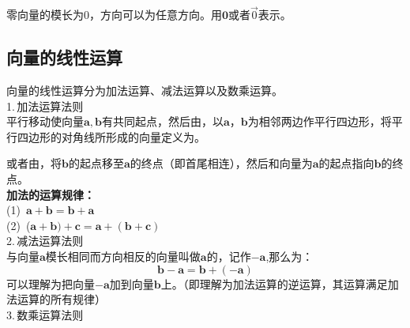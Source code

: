 \vspace*{-1em}
零向量的模长为0，方向可以为任意方向。用$\boldsymbol{0}$或者$\vec{0}$表示。
\subsection{向量的线性运算}
向量的线性运算分为加法运算、减法运算以及数乘运算。
\\ 1.$\,$加法运算法则\\

\vspace*{-1em}\vspace*{-1em}
平行移动使向量$\boldsymbol{a},\boldsymbol{b}$有共同起点，然后由，以$\boldsymbol{a}，\boldsymbol{b}$为相邻两边作平行四边形，将平行四边形的对角线所形成的向量定义为。
\par 或者由，将$\boldsymbol{b}$的起点移至$\boldsymbol{a}$的终点（即首尾相连），然后和向量为$\boldsymbol{a}$的起点指向$\boldsymbol{b}$的终点。
\\ \textbf{加法的运算规律：}\\
(1)$\,$  \qquad $\boldsymbol{a}+\boldsymbol{b}=\boldsymbol{b}+\boldsymbol{a} $\\
(2)$\,$  \qquad ($\boldsymbol{a}+\boldsymbol{b})+\boldsymbol{c}=\boldsymbol{a}+(\boldsymbol{b}+\boldsymbol{c}) $\\
2.$\,$减法运算法则\\

\vspace*{-1em}\vspace*{-1em}
与向量$\boldsymbol{a}$模长相同而方向相反的向量叫做$\boldsymbol{a}$的，记作$-\boldsymbol{a}$,那么为：
\begin{equation}
	\boldsymbol{b}-\boldsymbol{a}=\boldsymbol{b}+(-\boldsymbol{a})
\end{equation}
可以理解为把向量$-\boldsymbol{a}$加到向量$\boldsymbol{b}$上。（即理解为加法运算的逆运算，其运算满足加法运算的所有规律）
\\ 3.$\,$数乘运算法则\\

